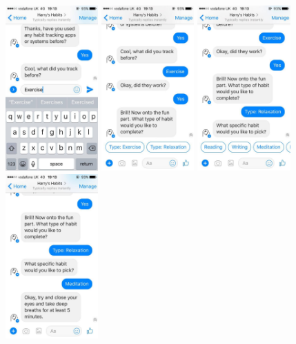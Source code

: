 \begin{figure}[H]
  \newline
  \newline
  \includegraphics[width=1.4in]{resources/design/process/5.jpg}
  \hspace{10px}
  \includegraphics[width=1.4in]{resources/design/process/6.jpg}
  \hspace{10px}
  \includegraphics[width=1.4in]{resources/design/process/7.jpg}
  \hspace{10px}
  \includegraphics[width=1.4in]{resources/design/process/8.jpg}

\end{figure}
